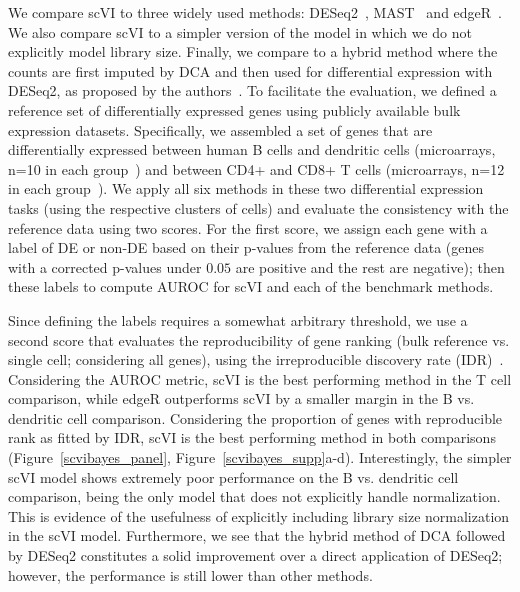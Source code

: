 We compare scVI to three widely used methods: DESeq2~\cite{deseq2}, MAST~\cite{mast} and edgeR~\cite{edgeR}. We also compare scVI to a simpler version of the model in which we do not explicitly model library size. Finally, we compare to a hybrid method where the counts are first imputed by DCA and then used for differential expression with DESeq2, as proposed by the authors~\cite{dca}. To facilitate the evaluation, we defined a reference set of differentially expressed genes using publicly available bulk expression datasets. Specifically, we assembled a set of genes that are differentially expressed between human B cells and dendritic cells (microarrays, n=10 in each group~\cite{Nakaya2011}) and between CD4+ and CD8+ T cells (microarrays, n=12 in each group~\cite{Gorgun2005}). We apply all six methods in these two differential expression tasks (using the respective clusters of cells) and evaluate the consistency with the reference data using two scores. For the first score, we assign each gene with a label of DE or non-DE based on their p-values from the reference data (genes with a corrected p-values under $0.05$ are positive and the rest are negative); then these labels to compute AUROC for scVI and each of the benchmark methods.

Since defining the labels requires a somewhat arbitrary threshold,  we use a second score that evaluates the reproducibility of gene ranking (bulk reference vs. single cell; considering all genes), using the irreproducible discovery rate (IDR)~\cite{Li2011}. Considering the AUROC metric, scVI is the best performing method in the T cell comparison, while edgeR outperforms scVI by a smaller margin in the B vs. dendritic cell comparison. Considering the proportion of genes with reproducible rank as fitted by IDR, scVI is the best performing method in both comparisons (Figure~\ref{scvibayes_panel}, Figure~\ref{scvibayes_supp}a-d). Interestingly, the simpler scVI model shows extremely poor performance on the B vs. dendritic cell comparison, being the only model that does not explicitly handle normalization. This is evidence of the usefulness of explicitly including library size normalization in the scVI model. Furthermore, we see that the hybrid method of DCA followed by DESeq2 constitutes a solid improvement over a direct application of DESeq2; however, the performance is still lower than other methods. 



